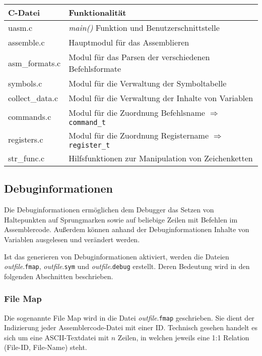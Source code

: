 \begin{center}
\begin{tabular}{ll}
C-Datei         & Funktionalität \\
\hline\hline
uasm.c          & \emph{main()} Funktion und Benutzerschnittstelle           \\
assemble.c      & Hauptmodul für das Assemblieren                            \\
asm\_formats.c  & Modul für das Parsen der verschiedenen Befehlsformate      \\
symbols.c       & Modul für die Verwaltung der Symboltabelle                 \\
collect\_data.c & Modul für die Verwaltung der Inhalte von Variablen         \\
commands.c      & Modul für die Zuordnung Befehlsname $\Rightarrow$ \texttt{command\_t}   \\
registers.c     & Modul für die Zuordnung Registername $\Rightarrow$ \texttt{register\_t} \\
str\_func.c     & Hilfsfunktionen zur Manipulation von Zeichenketten         \\
\end{tabular}
\end{center}

\subsection{Debuginformationen}

Die Debuginformationen ermöglichen dem Debugger das Setzen von Haltepunkten auf
Sprungmarken sowie auf beliebige Zeilen mit Befehlen im Assemblercode.
Außerdem können anhand der Debuginformationen Inhalte von Variablen ausgelesen
und verändert werden.

Ist das generieren von Debuginformationen aktiviert, werden die Dateien
\emph{outfile}.\texttt{fmap}, \emph{outfile}.\texttt{sym} und
\emph{outfile}.\texttt{debug} erstellt.
Deren Bedeutung wird in den folgenden Abschnitten beschrieben.

\subsubsection{File Map}

Die sogenannte File Map wird in die Datei \emph{outfile}.\texttt{fmap}
geschrieben. Sie dient der Indizierung jeder Assemblercode-Datei mit einer ID.
Technisch gesehen handelt es sich um eine ASCII-Textdatei mit $n$ Zeilen, in
welchen jeweils eine 1:1 Relation (File-ID, File-Name) steht.

